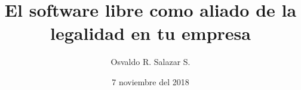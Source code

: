\documentclass {beamer}
\title{El software libre como aliado de la legalidad en tu empresa}
\author{Osvaldo R. Salazar S.}
\date{7 noviembre del 2018}
\begin{document}
    \frame{\titlepage}
    
    
    
    
    
    
    
    
    
    
\end{document}

